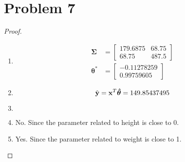 \documentclass{article}
\begin{document}
\section*{Problem 7}
    \begin{proof}
        \indent
        \begin{enumerate}[label=(\alph*)]
            \item
                \begin{align*}
                \bm{\Sigma}&=\begin{bmatrix}
                    179.6875 & 68.75\\
                    68.75    & 487.5
                \end{bmatrix}\\
                \bm{\theta^*}&=\begin{bmatrix}
                    -0.11278259\\
                    0.99759605
                \end{bmatrix}
                \end{align*}
            \item
                $$ \hat{\vb{y}}= \vb{x}^T \bm{\hat{\theta}}=149.85437495 $$
            \item
                $$  $$
            \item No. Since the parameter related to height is close to 0.
            \item Yes. Since the parameter related to weight is close to 1.
        \end{enumerate}
    \end{proof}
\end{document}
